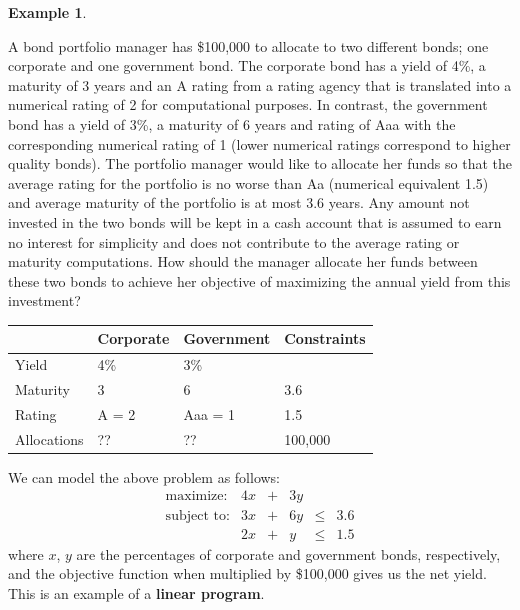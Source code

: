 \documentclass[
]{book}
\theoremstyle{definition}
\theoremstyle{definition}
\newtheorem{example}{Example}[chapter]
\theoremstyle{definition}
\theoremstyle{definition}
\theoremstyle{remark}
\begin{document}
\begin{example}
\protect\hypertarget{exm:bond-portfolio}{}\label{exm:bond-portfolio}

A bond portfolio manager has \$100,000 to allocate to two different bonds; one corporate and one government bond.
The corporate bond has a yield of 4\%, a maturity of 3 years and an A rating from a rating agency that is translated into a numerical rating of 2 for computational purposes.
In contrast, the government bond has a yield of 3\%, a maturity of 6 years and rating of Aaa with the corresponding numerical rating of 1 (lower numerical ratings correspond to higher quality bonds). The portfolio manager would like to allocate her funds so that the average rating for the portfolio is no worse than Aa (numerical equivalent 1.5) and average maturity of the portfolio is at most 3.6 years.
Any amount not invested in the two bonds will be kept in a cash account that is assumed to earn no interest for simplicity and does not contribute to the average rating or maturity computations.
How should the manager allocate her funds between these two bonds to achieve her objective of maximizing the annual yield from this investment? \citep{optimization-methods-in-finance}

\begin{longtable}[]{@{}llll@{}}
\toprule
& Corporate & Government & Constraints \\
\midrule
\endhead
Yield & 4\% & 3\% & \\
Maturity & 3 & 6 & 3.6 \\
Rating & A = 2 & Aaa = 1 & 1.5 \\
Allocations & ?? & ?? & 100,000 \\
\bottomrule
\end{longtable}

\end{example}

We can model the above problem as follows:
\begin{equation}
  \begin{array}{rrrrrr}
  \mbox{maximize:} & 4x & + & 3y \\
  \mbox{subject to:}
    & 3x & + & 6y & \le & 3.6 \\
    & 2x & + & y & \le & 1.5 
  \end{array}
  \label{eq:bond-portfolio-lp-incomplete}
\end{equation}
where \(x\), \(y\) are the percentages of corporate and government bonds, respectively, and the objective function when multiplied by \$100,000 gives us the net yield. This is an example of a \textbf{linear program}.
\end{document}
